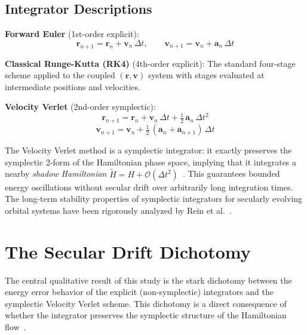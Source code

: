 \documentclass[twocolumn, 10pt]{article}
\begin{document}
\subsection{Integrator Descriptions}

\textbf{Forward Euler} (1st-order explicit):
\begin{equation}
\mathbf{r}_{n+1} = \mathbf{r}_n + \mathbf{v}_n\,\Delta t, \qquad \mathbf{v}_{n+1} = \mathbf{v}_n + \mathbf{a}_n\,\Delta t
\label{eq:euler}
\end{equation}

\textbf{Classical Runge-Kutta (RK4)} (4th-order explicit): The standard four-stage scheme applied to the coupled $(\mathbf{r}, \mathbf{v})$ system with stages evaluated at intermediate positions and velocities.

\textbf{Velocity Verlet} (2nd-order symplectic):
\begin{equation}
\mathbf{r}_{n+1} = \mathbf{r}_n + \mathbf{v}_n\,\Delta t + \tfrac{1}{2}\,\mathbf{a}_n\,\Delta t^2
\label{eq:verlet_r}
\end{equation}
\begin{equation}
\mathbf{v}_{n+1} = \mathbf{v}_n + \tfrac{1}{2}\,(\mathbf{a}_n + \mathbf{a}_{n+1})\,\Delta t
\label{eq:verlet_v}
\end{equation}

The Velocity Verlet method is a symplectic integrator: it exactly preserves the symplectic 2-form of the Hamiltonian phase space, implying that it integrates a nearby \textit{shadow Hamiltonian} $\tilde{H} = H + \mathcal{O}(\Delta t^2)$~\cite{kinoshita1991}. This guarantees bounded energy oscillations without secular drift over arbitrarily long integration times. The long-term stability properties of symplectic integrators for secularly evolving orbital systems have been rigorously analyzed by Rein et al.~\cite{rein2019}.

\section{The Secular Drift Dichotomy}

The central qualitative result of this study is the stark dichotomy between the energy error behavior of the explicit (non-symplectic) integrators and the symplectic Velocity Verlet scheme. This dichotomy is a direct consequence of whether the integrator preserves the symplectic structure of the Hamiltonian flow~\cite{kinoshita1991, rein2019}.
\end{document}
